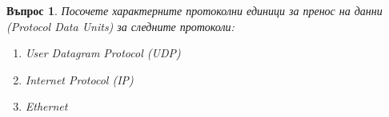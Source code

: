 \documentclass[11pt]{scrartcl}
\newtheorem{q}{Въпрос}
\newenvironment{defractors}{
\begin{enumerate}
  \setlength{\itemsep}{1pt}
  \setlength{\parskip}{0pt}
  \setlength{\parsep}{0pt}
}{\end{enumerate}}
\begin{document}
\begin{q}
  Посочете характерните протоколни единици за пренос на данни (Protocol Data
  Units) за следните протоколи:

  \begin{defractors}
  \item User Datagram Protocol (UDP)
  \item Internet Protocol (IP)
  \item Ethernet
  \end{defractors}
\end{q}
\end{document}
